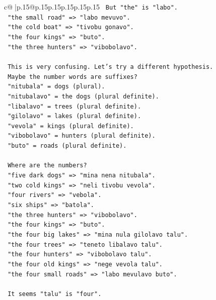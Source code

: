 \documentclass{article}
\begin{document}
{\begin{supertabular}{c@{$\;$}|p{.15\linewidth}@{}p{.15\linewidth}p{.15\linewidth}p{.15\linewidth}p{.15\linewidth}p{.15\linewidth}}
{{{\texttt{   But "the" is "labo".} \\
\texttt{   "the small road" => "labo mevuvo".} \\
\texttt{   "the cold boat" => "tivobu gonavo".} \\
\texttt{   "the four kings" => "buto".} \\
\texttt{   "the three hunters" => "vibobolavo".} \\
\\ 
\texttt{   This is very confusing. Let's try a different hypothesis.} \\
\texttt{   Maybe the number words are suffixes?} \\
\texttt{   "nitubala" = dogs (plural).} \\
\texttt{   "nitubalavo" = the dogs (plural definite).} \\
\texttt{   "libalavo" = trees (plural definite).} \\
\texttt{   "gilolavo" = lakes (plural definite).} \\
\texttt{   "vevola" = kings (plural definite).} \\
\texttt{   "vibobolavo" = hunters (plural definite).} \\
\texttt{   "buto" = roads (plural definite).} \\
\\ 
\texttt{   Where are the numbers?} \\
\texttt{   "five dark dogs" => "mina nena nitubala".} \\
\texttt{   "two cold kings" => "neli tivobu vevola".} \\
\texttt{   "four rivers" => "vebola".} \\
\texttt{   "six ships" => "batola".} \\
\texttt{   "the three hunters" => "vibobolavo".} \\
\texttt{   "the four kings" => "buto".} \\
\texttt{   "the four big lakes" => "mina nula gilolavo talu".} \\
\texttt{   "the four trees" => "teneto libalavo talu".} \\
\texttt{   "the four hunters" => "vibobolavo talu".} \\
\texttt{   "the four old kings" => "nege vevola talu".} \\
\texttt{   "the four small roads" => "labo mevulavo buto".} \\
\\ 
\texttt{   It seems "talu" is "four".} \\
}}}
\end{supertabular}}
\end{document}
